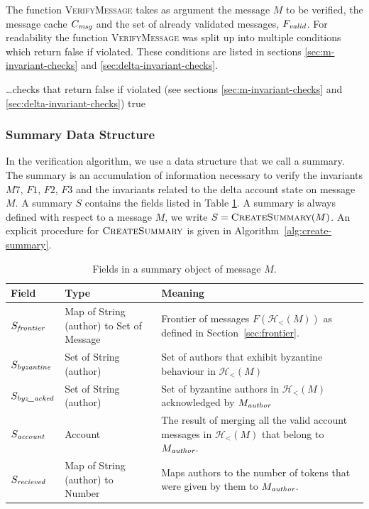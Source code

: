 \documentclass{article}
\begin{document}
The function \textsc{VerifyMessage} takes as argument the message $M$ to be verified, the message cache $C_\emph{msg}$ and the set of already validated messages, $F_\emph{valid}$.
For readability the function \textsc{VerifyMessage} was split up into multiple conditions which return false if violated. These conditions are listed in sections \ref{sec:m-invariant-checks} and \ref{sec:delta-invariant-checks}.

\begin{algorithm}[ht]
    \caption{Basic structure of the function verifying individual messages}
\begin{algorithmic}
    \State \ldots \Comment checks that return false if violated (see sections \ref{sec:m-invariant-checks} and \ref{sec:delta-invariant-checks})
    \State \Return true
\EndFunction
\end{algorithmic}
\end{algorithm}

\subsubsection{Summary Data Structure}
In the verification algorithm, we use a data structure that we call a summary.
The summary is an accumulation of information necessary to verify the invariants $M7$, $F1$, $F2$, $F3$ and the invariants related to the delta account state on message $M$. A summary $S$ contains the fields listed in Table \ref{tab:summary-fields}. A summary is always defined with respect to a message $M$, we write $S = \textsc{CreateSummary}(M)$. An explicit procedure for $\textsc{CreateSummary}$ is given in Algorithm~\ref{alg:create-summary}.
\begin{table}[ht]
    \begin{tabular}{|l|l|p{6cm}|}
        \hline
        \textbf{Field} & \textbf{Type} & \textbf{Meaning} \\ \hline
        $S_\emph{frontier}$ &
        Map of String (author) to Set of Message&
        Frontier of messages $F(\mathcal H_<(M))$ as defined in Section~\ref{sec:frontier}.
        \\ \hline
        $S_\emph{byzantine}$ &
        Set of String (author)&
        Set of authors that exhibit byzantine behaviour in $\mathcal H_<(M)$
        \\ \hline
        $S_\emph{byz\_acked}$ &
        Set of String (author)&
        Set of byzantine authors in $\mathcal H_<(M)$ acknowledged by $M_\emph{author}$
        \\ \hline
        $S_\emph{account}$ &
        Account &
        The result of merging all the valid account messages in $\mathcal H_<(M)$ that belong to $M_\emph{author}$.
        \\ \hline
        $S_\emph{recieved}$ &
        Map of String (author) to Number &
        Maps authors to the number of tokens that were given by them to $M_\emph{author}$.
        \\ \hline
    \end{tabular}
    \caption{Fields in a summary object of message $M$.}
    \label{tab:summary-fields}
\end{table}
\end{document}
